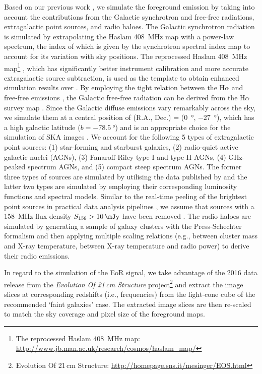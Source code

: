 \documentclass[fleqn,usenatbib]{mnras}
\begin{document}
{Based on our previous work \citep{wang2010}, we simulate the foreground
emission by taking into account the contributions from the Galactic
synchrotron and free-free radiations, extragalactic point sources, and
radio haloes.
The Galactic synchrotron radiation is simulated by extrapolating the Haslam
\SI{408}{\MHz} map with a power-law spectrum, the index of which is given
by the synchrotron spectral index map \citep{giardino2002} to account for
its variation with sky positions.
The reprocessed Haslam \SI{408}{\MHz} map\footnote{%
  The reprocessed Haslam \SI{408}{\MHz} map:
  \url{http://www.jb.man.ac.uk/research/cosmos/haslam_map/}}
\citep{remazeilles2015}, which has significantly better instrument
calibration and more accurate extragalactic source subtraction,
is used as the template to obtain enhanced simulation results over
\citet{wang2010}.
By employing the tight relation between the H$\alpha$ and free-free
emissions \citep[see][and references therein]{dickinson2003}, the Galactic
free-free radiation can be derived from the H$\alpha$ survey map
\citep{finkbeiner2003}.
Since the Galactic diffuse emissions vary remarkably across the sky, we
simulate them at a central position of (R.A., Dec\@.) = (\SI{0}{\degree},
\SI{-27}{\degree}), which has a high galactic latitude
($b = \SI{-78.5}{\degree}$) and is an appropriate choice for the simulation
of SKA images \citep[e.g.,][]{beardsley2016}.
We account for the following 5 types of extragalactic point sources:
(1) star-forming and starburst galaxies, (2) radio-quiet active galactic
nuclei (AGNs), (3) Fanaroff-Riley type I and type II AGNs, (4) GHz-peaked
spectrum AGNs, and (5) compact steep spectrum AGNs.
The former three types of sources are simulated by utilising the data
published by \citet{wilman2008} and the latter two types are simulated by
employing their corresponding luminosity functions and spectral models.
Similar to the real-time peeling of the brightest point sources in
practical data analysis pipelines \citep[e.g.,][]{mitchell2008,intema2009},
we assume that sources with a \SI{158}{\MHz} flux density
$S_{158} > \SI{10}{\mJy}$ have been removed \citep[e.g.,][]{liu2009ps}.
The radio haloes are simulated by generating a sample of galaxy clusters
with the Press-Schechter formalism \citep{press1974} and then applying
multiple scaling relations (e.g., between cluster mass and X-ray
temperature, between X-ray temperature and radio power) to derive their
radio emissions.

In regard to the simulation of the EoR signal, we take advantage of the
2016 data release from the
\textit{Evolution Of 21\,cm Structure} project\footnote{%
  Evolution Of 21\,cm Structure:
  \url{http://homepage.sns.it/mesinger/EOS.html}}
\citep{mesinger2016} and extract the image slices at corresponding
redshifts (i.e., frequencies) from the light-cone cube of the recommended
`faint galaxies' case.
The extracted image slices are then re-scaled to match the sky coverage and
pixel size of the foreground maps.

}
\end{document}
